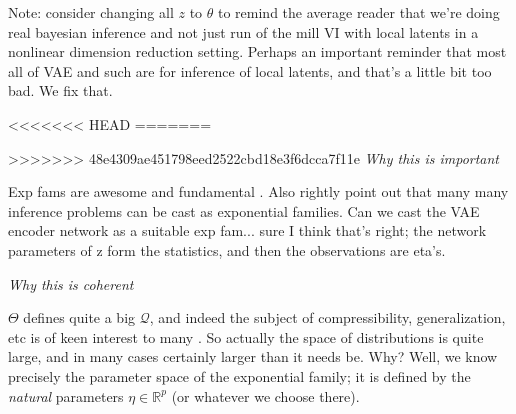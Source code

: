 \documentclass{article}
\begin{document}
 Note: consider changing all $z$ to $\theta$ to remind the average reader that we're doing real bayesian inference and not just run of the mill VI with local latents in a nonlinear dimension reduction setting.  Perhaps an important reminder that most all of VAE and such are for inference of local latents, and that's a little bit too bad.  We fix that.

%


<<<<<<< HEAD
=======
%

>>>>>>> 48e4309ae451798eed2522cbd18e3f6dcca7f11e
 \emph{Why this is important}
 
Exp fams are awesome and fundamental \cite{}.  Also \cite{wainwrightjordan2008graphical} rightly point out that many many inference problems can be cast as exponential families.  Can we cast the VAE encoder network as a suitable exp fam... sure I think that's right; the network parameters of z form the statistics, and then the observations are eta's.  
 
 \emph{Why this is coherent}
 
 $\Theta$ defines quite a big $\mathcal{Q}$, and indeed the subject of compressibility, generalization, etc is of keen interest to many \cite{zhou2018compressability}.  So actually the space of distributions is quite large, and in many cases certainly larger than it needs be.  Why?  Well, we know precisely the parameter space of the exponential family; it is defined by the \emph{natural} parameters $\eta \in \mathbb{R}^p$ (or whatever we choose there).
 
\end{document}
